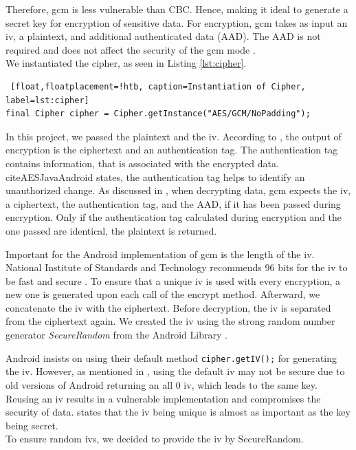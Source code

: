Therefore, \gls{gcm} is less vulnerable than CBC. Hence, making it ideal to generate a secret key for encryption of sensitive data. For encryption, \gls{gcm} takes as input an \gls{iv}, a plaintext, and additional authenticated data (AAD). The AAD is not required and does not affect the security of the \gls{gcm} mode \cite{AADsecure}. \\ %
We instantiated the cipher, as seen in Listing \ref{lst:cipher}.

\begin{lstlisting} [float,floatplacement=!htb, caption=Instantiation of Cipher, label=lst:cipher]
final Cipher cipher = Cipher.getInstance("AES/GCM/NoPadding");
\end{lstlisting}

In this project, we passed the plaintext and the \gls{iv}. According to \cite{dworkin2007sp}, the output of encryption is the ciphertext and an authentication tag. The authentication tag contains information, that is associated with the encrypted data. cite{AESJavaAndroid} states, the authentication tag helps to identify an unauthorized change. As discussed in \cite{dworkin2007sp}, when decrypting data, \gls{gcm} expects the \gls{iv}, a ciphertext, the authentication tag, and the AAD, if it has been passed during encryption. Only if the authentication tag calculated during encryption and the one passed are identical, the plaintext is returned.

Important for the Android implementation of \gls{gcm} is the length of the \gls{iv}. National Institute of Standards and Technology recommends 96 bits for the \gls{iv} to be fast and secure \cite{dworkin2007sp}. To ensure that a unique \gls{iv} is used with every encryption, a new one is generated upon each call of the encrypt method. Afterward, we concatenate the \gls{iv} with the ciphertext. Before decryption, the \gls{iv} is separated from the ciphertext again. We created the \gls{iv} using the strong random number generator \textit{SecureRandom} from the Android Library \cite{SecureRandom}.

Android insists on using their default method \texttt{cipher.getIV();} for generating the \gls{iv}. However, as mentioned in \cite{DefaultIV}, using the default \gls{iv} may not be secure due to old versions of Android returning an all 0 \gls{iv}, which leads to the same key. Reusing an \gls{iv} results in a vulnerable implementation and compromises the security of data. \cite{dworkin2007sp} states that the \gls{iv} being unique is almost as important as the key being secret. \\
To ensure random \gls{iv}s, we decided to provide the \gls{iv} by SecureRandom. 

